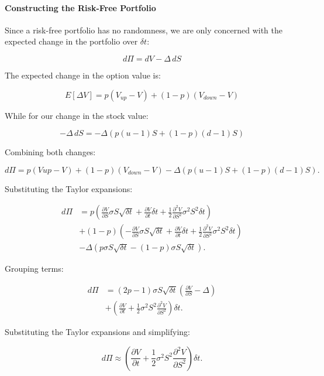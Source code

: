 \documentclass{article}
\begin{document}
\paragraph{Constructing the Risk-Free Portfolio}

Since a risk-free portfolio has no randomness, we are only concerned with the expected change in the portfolio over $\delta t$:

 \[
    d\Pi = dV - \Delta \, dS
 \]

 The expected change in the option value is:

 \[
 E[\Delta V] = p(V_{up} - V) + (1 - p)(V_{down} - V)
 \]

 While for our change in the stock value:

 \[
    - \Delta \, dS = -\Delta \left( p(u - 1)S + (1 - p)(d - 1)S \right)
 \]


Combining both changes:

\[
    d\Pi = p (V{up} - V) + (1 - p)(V_{down} - V) - \Delta (p(u - 1)S + (1 - p)(d - 1)S).
\]

Substituting the Taylor expansions:

\begin{align*}
    d\Pi &= p \left( \frac{\partial V}{\partial S} \sigma S \sqrt{\delta t} + \frac{\partial V}{\partial t} \delta t + \frac{1}{2} \frac{\partial^2 V}{\partial S^2} \sigma^2 S^2 \delta t \right) \\
    &+ (1 - p) \left( -\frac{\partial V}{\partial S} \sigma S \sqrt{\delta t} + \frac{\partial V}{\partial t} \delta t + \frac{1}{2} \frac{\partial^2 V}{\partial S^2} \sigma^2 S^2 \delta t \right) \\
    &- \Delta \left( p \sigma S \sqrt{\delta t} - (1 - p) \sigma S \sqrt{\delta t} \right).
\end{align*}

Grouping terms:

\begin{align*}
    d\Pi &= (2p - 1) \sigma S \sqrt{\delta t} \left( \frac{\partial V}{\partial S} - \Delta \right) \\
    &+ \left( \frac{\partial V}{\partial t} + \frac{1}{2} \sigma^2 S^2 \frac{\partial^2 V}{\partial S^2} \right) \delta t.
\end{align*}

Substituting the Taylor expansions and simplifying:

\[
    d\Pi \approx \left( \frac{\partial V}{\partial t} + \frac{1}{2} \sigma^2 S^2 \frac{\partial^2 V}{\partial S^2} \right) \delta t.
\]
\end{document}

